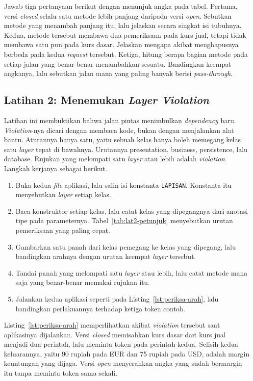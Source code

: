 Jawab tiga pertanyaan berikut dengan menunjuk angka pada tabel. Pertama, versi
\textit{closed} selalu satu metode lebih panjang daripada versi \textit{open}.
Sebutkan metode yang menambah panjang itu, lalu jelaskan secara singkat isi tubuhnya. Kedua,
metode tersebut membawa dua pemeriksaan pada kurs jual, tetapi tidak membawa
satu pun pada kurs dasar. Jelaskan mengapa akibat menghapusnya berbeda pada
kedua \textit{request} tersebut. Ketiga, hitung berapa bagian metode pada setiap
jalan yang benar-benar menambahkan sesuatu. Bandingkan keempat angkanya, lalu
sebutkan jalan mana yang paling banyak berisi \textit{pass-through}.

\subsection*{Latihan 2: Menemukan \textit{Layer Violation}}

Latihan ini membuktikan bahwa jalan pintas menimbulkan \textit{dependency} baru.
\textit{Violation}-nya dicari dengan membaca kode, bukan dengan menjalankan alat bantu.
Aturannya hanya satu, yaitu sebuah kelas hanya boleh memegang kelas satu
\textit{layer} tepat di bawahnya. Urutannya presentation, business,
persistence, lalu database. Rujukan yang melompati satu \textit{layer} atau
lebih adalah \textit{violation}. Langkah kerjanya sebagai berikut.

\begin{enumerate}
  \item Buka kedua \textit{file} aplikasi, lalu salin isi konstanta \texttt{LAPISAN}.
    Konstanta itu menyebutkan \textit{layer} setiap kelas.
  \item Baca konstruktor setiap kelas, lalu catat kelas yang dipegangnya dari
    anotasi tipe pada parameternya. Tabel~\ref{tab:lat2-petunjuk} menyebutkan
    urutan pemeriksaan yang paling cepat.
  \item Gambarkan satu panah dari kelas pemegang ke kelas yang dipegang, lalu
    bandingkan arahnya dengan urutan keempat \textit{layer} tersebut.
  \item Tandai panah yang melompati satu \textit{layer} atau lebih, lalu catat
    metode mana saja yang benar-benar memakai rujukan itu.
  \item Jalankan kedua aplikasi seperti pada Listing~\ref{lst:periksa-arah},
    lalu bandingkan perlakuannya terhadap ketiga token contoh.
\end{enumerate}

Listing~\ref{lst:periksa-arah} memperlihatkan akibat \textit{violation}
tersebut saat aplikasinya dijalankan. Versi \textit{closed} memisahkan kurs
dasar dari kurs jual menjadi dua perintah, lalu meminta token pada perintah
kedua. Selisih kedua keluarannya, yaitu 90 rupiah pada EUR dan 75 rupiah pada
USD, adalah margin keuntungan yang dijaga. Versi \textit{open} menyerahkan
angka yang sudah bermargin itu tanpa meminta token sama sekali.

